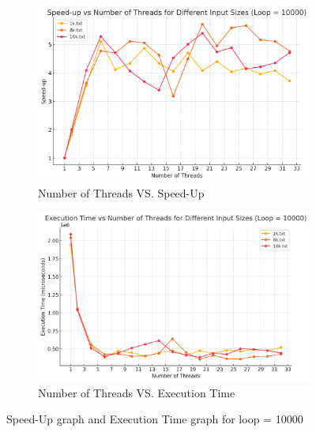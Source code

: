 \documentclass[letterpaper,12pt]{article}
\theoremstyle{remark}
\begin{document}
\begin{figure}[H]
    \centering
    \begin{subfigure}[t]{0.48\textwidth}  %
        \centering
        \includegraphics[width=\textwidth]{codioWithSleepLoop10000.png}
        \caption{Number of Threads VS. Speed-Up}
        \label{fig:ThreadVsSpeedUp1}
    \end{subfigure}
    \hfill  %
    \begin{subfigure}[t]{0.48\textwidth}  %
        \centering
        \includegraphics[width=\textwidth]{codioExecutionTimeLoop10000.png}
        \caption{Number of Threads VS. Execution Time}
        \label{fig:ThreadVsExecutionTime}
    \end{subfigure}
    \caption{Speed-Up graph and Execution Time graph for loop = 10000}
    \label{fig:ThreadVsComparison}
\end{figure}
\hfill  %
\end{document}
